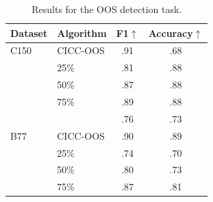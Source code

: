 \begin{table}[h!]
\centering
\setlength\tabcolsep{2pt}
\begin{tabular}{ll|cc}
\toprule
Dataset         &  Algorithm                & F1$\uparrow$    & Accuracy$\uparrow$ \\
\midrule
C150            &   CICC-OOS                    & .91   & .68 \\ 
                &   \citet{zhan2021out} 25\%   & .81   & .88 \\
                &   \citet{zhan2021out} 50\%   & .87   & .88 \\
                &   \citet{zhan2021out} 75\%   & .89   & .88 \\
                &   \citet{cavalin2020improving}& .76  & .73 \\ \midrule
B77             &   CICC-OOS                    & .90   & .89 \\
                &   \citet{zhan2021out} 25\%   & .74   & .70 \\
                &   \citet{zhan2021out} 50\%   & .80   & .73 \\
                &   \citet{zhan2021out} 75\%   & .87   & .81 \\
\bottomrule
\end{tabular}
    \caption{Results for the OOS detection task.}
    \label{tab:ood_results_app}
\end{table}